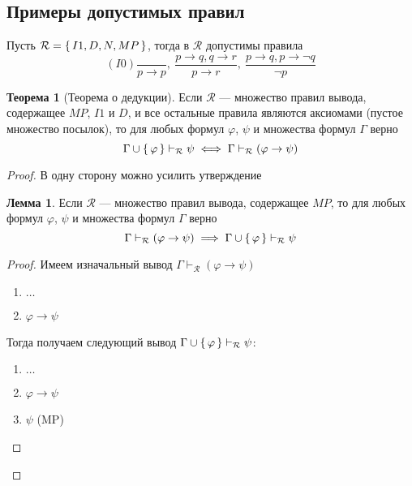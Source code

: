 \documentclass[12pt]{article}
\let\im\rightarrow
\let\n\neg
\let\un\cup
\theoremstyle{definition}
\newtheorem{theorem}{Теорема}[section]
\theoremstyle{statement}
\theoremstyle{theorem}
\newtheorem{lemma}{Лемма}[section]
\begin{document}
\subsection{Примеры допустимых правил}
Пусть $\mathcal{R} = \set{I1, D, N, MP}$, тогда в $\mathcal{R}$
допустимы правила
\begin{displaymath}
  (I0)\frac{}{p \im p},\ \frac{p \im q, q \im r}{p \im r},\ \frac{p
  \im q, p \im \n q}{\n p}
\end{displaymath}

\begin{theorem}[Теорема о дедукции]
  Если $\mathcal{R}$ --- множество правил вывода, содержащее $MP$,
  $I1$ и $D$, и все остальные правила являются аксиомами (пустое
  множество посылок), то для любых формул $\varphi$, $\psi$ и
  множества формул $\Gamma$ верно
  \begin{displaymath}
    \Gamma \un \set{\varphi} \vdash_{\mathcal{R}} \psi \iff \Gamma
    \vdash_{\mathcal{R}} (\varphi \im \psi)
  \end{displaymath}
  \begin{proof}
    В одну сторону можно усилить утверждение

    \begin{lemma}
      Если $\mathcal{R}$ --- множество правил вывода, содержащее $MP$,
      то для любых формул $\varphi$, $\psi$ и множества формул $\Gamma$ верно
      \[
        \Gamma \vdash_{\mathcal{R}} (\varphi \im \psi) \implies \Gamma
        \un \set{\varphi} \vdash_{\mathcal{R}} \psi
      \]
      \begin{proof}
        Имеем изначальный вывод $\Gamma \vdash_{\mathcal{R}} (\varphi \im \psi)$
        \begin{enumerate}
          \item $\dots$

          \item $\varphi \im \psi$
        \end{enumerate}
        Тогда получаем следующий вывод $\Gamma \un \set{\varphi}
        \vdash_{\mathcal{R}} \psi$:
        \begin{enumerate}
          \item $\dots$

          \item $\varphi \im \psi$

          \item $\psi$ (MP)
        \end{enumerate}
      \end{proof}
    \end{lemma}


\end{proof}
\end{theorem}
\end{document}
